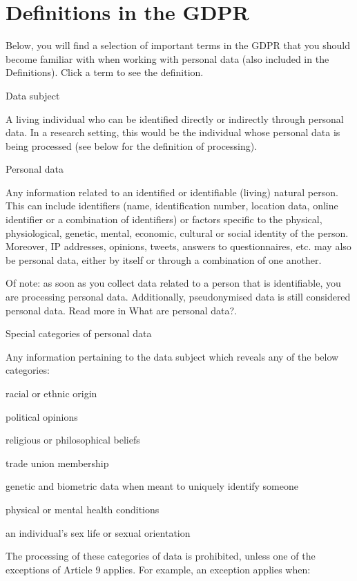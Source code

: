 \documentclass[
]{book}
\begin{document}
\hypertarget{definitions}{%
\section{Definitions in the GDPR}\label{definitions}}

Below, you will find a selection of important terms in the GDPR that you should
become familiar with when working with personal data (also included in the
Definitions). Click a term to see the definition.

Data subject

A living individual who can be identified directly or indirectly through
personal data. In a research setting, this would be the individual whose
personal data is being processed (see below for the definition of processing).

Personal data

Any information related to an identified or identifiable (living) natural
person. This can include identifiers (name, identification number, location
data, online identifier or a combination of identifiers) or factors specific
to the physical, physiological, genetic, mental, economic, cultural or social
identity of the person. Moreover, IP addresses, opinions, tweets, answers to
questionnaires, etc. may also be personal data, either by itself or through a
combination of one another.

Of note: as soon as you collect data related to a person that is identifiable,
you are processing personal data. Additionally, pseudonymised data is still
considered personal data. Read more in
What are personal data?.

Special categories of personal data

Any information pertaining to the data subject which reveals any of the below categories:

racial or ethnic origin

political opinions

religious or philosophical beliefs

trade union membership

genetic and biometric data when meant to uniquely identify someone

physical or mental health conditions

an individual's sex life or sexual orientation

The processing of these categories of data is prohibited, unless one of
the exceptions of Article 9
applies. For example, an exception applies when:
\end{document}
